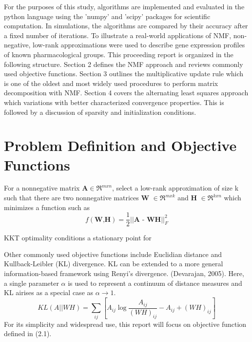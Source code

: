 \documentclass[final,leqno,onefignum,onetabnum]{siamltex1213}
\begin{document}
For the purposes of this study, algorithms are implemented and evaluated in the python language using the 'numpy' and 'scipy' packages for scientific computation. In simulations, the algorithms are compared by their accuracy after a fixed number of iterations. To illustrate a real-world applications of NMF, non-negative, low-rank approximations were used to describe gene expression profiles of known pharmacological groups. This proceeding report is organized in the following structure. Section 2 defines the NMF approach and reviews commonly used objective functions. Section 3 outlines the multiplicative update rule which is one of the oldest and most widely used procedures to perform matrix decomposition with NMF. Section 4 covers the alternating least squares approach which variations with better characterized convergence properties. This is followed by a discussion of sparsity and initialization conditions. 

\section{Problem Definition and Objective Functions}

\begin{definition} For a nonnegative matrix $\textbf{A} \in \Re^{m x n} $, select a low-rank approximation of size k such that there are two nonnegative matrices \textbf{W} $ \in \Re^{m x k}$ and \textbf{H} $ \in \Re^{k x n}$ which minimizes a function such as 
\begin{equation}\label{ObjEuc}
 f( \textbf{W,H}) = \frac{1}{2} || \textbf{A - WH} || ^{2}_{F}
\end{equation}

\end{definition}

KKT optimality conditions a stationary point for 




Other commonly used objective functions include Euclidian distance and Kullback-Leibler (KL) divergence. KL can be extended to a more general information-based framework using Renyi's divergence. (Devarajan, 2005). Here, a single parameter $\alpha$ is used to represent a continuum of distance measures and KL airises as a special case as $\alpha \to 1$. 
\begin{equation}\label{ObjKL}
 KL(A || WH) = \sum_{ij}{[A_{ij} \log{ \frac{A_{ij}}{(WH)_{ij}} - A_{ij} + (WH)_{ij}} ]}
\end{equation}
For its simplicity and widespread use, this report will focus on objective function defined in (2.1). 
\end{document}
